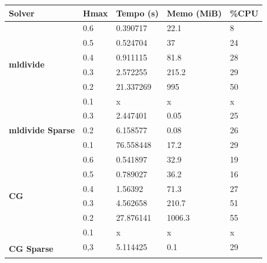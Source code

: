 \documentclass[
    12pt,               %
    openright,          %
    oneside,
    a4paper,            %
    english,            %
    french,             %
    spanish,            %
    brazil              %
    ]{abntex2}
\begin{document}
\begin{table}[]
	\centering
	\begin{tabular}{|l|l|l|l|l|}
		\hline
		\textbf{Solver}                         & \textbf{Hmax} & \textbf{Tempo (s)} & \textbf{Memo (MiB)} & \textbf{\%CPU} \\ \hline
		\multirow{6}{*}{\textbf{mldivide}}        & 0.6           & 0.390717           & 22.1                & 8              \\ \cline{2-5} 
		& 0.5           & 0.524704           & 37                  & 24             \\ \cline{2-5} 
		& 0.4           & 0.911115           & 81.8                & 28             \\ \cline{2-5} 
		& 0.3           & 2.572255           & 215.2               & 29             \\ \cline{2-5} 
		& 0.2           & 21.337269          & 995                 & 50             \\ \cline{2-5} 
		& 0.1           & x                  & x                   & x              \\ \hline
		\multirow{3}{*}{\textbf{mldivide Sparse}} & 0.3           & 2.447401           & 0.05                & 25             \\ \cline{2-5} 
		& 0.2           & 6.158577           & 0.08                & 26             \\ \cline{2-5} 
		& 0.1           & 76.558448          & 17.2                & 29             \\ \hline
		\multirow{6}{*}{\textbf{CG}}            & 0.6           & 0.541897           & 32.9                & 19             \\ \cline{2-5} 
		& 0.5           & 0.789027           & 36.2                & 16             \\ \cline{2-5} 
		& 0.4           & 1.56392            & 71.3                & 27             \\ \cline{2-5} 
		& 0.3           & 4.562658           & 210.7               & 51             \\ \cline{2-5} 
		& 0.2           & 27.876141          & 1006.3              & 55             \\ \cline{2-5} 
		& 0.1           & x                  & x                   & x              \\ \hline
		\multirow{4}{*}{\textbf{CG Sparse}}     & 0,3           & 5.114425           & 0.1                 & 29             \\ \cline{2-5} 

\end{tabular}
\end{table}
\end{document}
